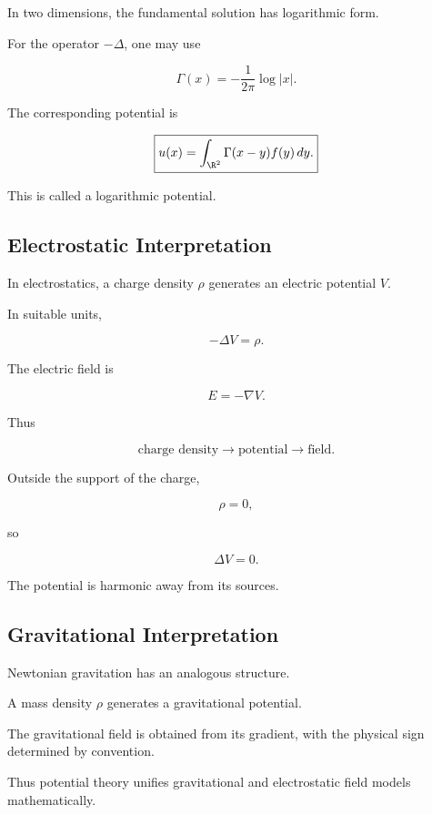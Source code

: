 In two dimensions, the fundamental solution has logarithmic form.

For the operator \(-\Delta\), one may use

\[
\boxed{
\Gamma(x)
=
-\frac{1}{2\pi}\log|x|.
}
\]

The corresponding potential is

\[
\boxed{
u(x)
=
\int_{\R^2}
\Gamma(x-y)f(y)\,dy.
}
\]

This is called a logarithmic potential.

\subsection{Electrostatic Interpretation}
\label{subsec:electrostatic-potential}

In electrostatics, a charge density \(\rho\) generates an electric
potential \(V\).

In suitable units,

\[
\boxed{
-\Delta V=\rho.
}
\]

The electric field is

\[
\boxed{
E=-\nabla V.
}
\]

Thus

\[
\boxed{
\text{charge density}
\longrightarrow
\text{potential}
\longrightarrow
\text{field}.
}
\]

Outside the support of the charge,

\[
\rho=0,
\]

so

\[
\boxed{
\Delta V=0.
}
\]

The potential is harmonic away from its sources.

\subsection{Gravitational Interpretation}
\label{subsec:gravitational-potential}

Newtonian gravitation has an analogous structure.

A mass density \(\rho\) generates a gravitational potential.

The gravitational field is obtained from its gradient, with the physical
sign determined by convention.

Thus potential theory unifies gravitational and electrostatic field
models mathematically.

